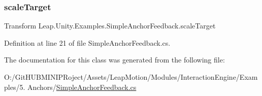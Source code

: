 \subsubsection{\texorpdfstring{scaleTarget}{scaleTarget}}
{\footnotesize\ttfamily Transform Leap.\+Unity.\+Examples.\+Simple\+Anchor\+Feedback.\+scale\+Target}



Definition at line 21 of file Simple\+Anchor\+Feedback.\+cs.



The documentation for this class was generated from the following file\+:\begin{DoxyCompactItemize}
\item 
O\+:/\+Git\+H\+U\+B\+M\+I\+N\+I\+P\+Roject/\+Assets/\+Leap\+Motion/\+Modules/\+Interaction\+Engine/\+Examples/5. Anchors/\mbox{\hyperlink{_simple_anchor_feedback_8cs}{Simple\+Anchor\+Feedback.\+cs}}\end{DoxyCompactItemize}
